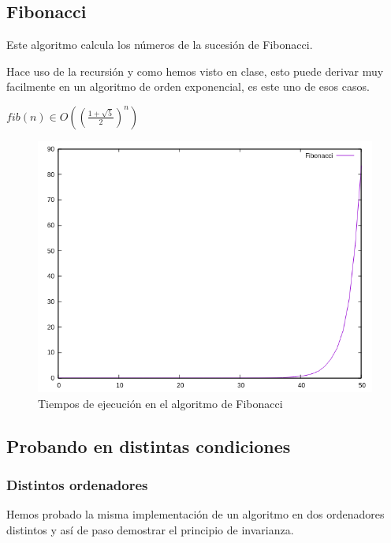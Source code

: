 \documentclass{article}
\begin{document}
\subsection{Fibonacci}
Este algoritmo calcula los números de la sucesión de Fibonacci. 
\

Hace uso de la recursión y como hemos visto en clase, esto puede derivar muy facilmente en un algoritmo de orden exponencial, es este uno de esos casos.
\

$fib(n) \in O((\frac{1+\sqrt5}{2})^n)$


\begin{figure}[H]
	\centering
	\includegraphics[totalheight=8cm]{img/fibonacci}
	\caption{Tiempos de ejecución en el algoritmo de Fibonacci}
	\label{fig:fibonacci}
\end{figure}

\subsection{Probando en distintas condiciones}
\subsubsection{Distintos ordenadores}
Hemos probado la misma implementación de un algoritmo en dos ordenadores distintos y así de paso demostrar el principio de invarianza.
\
\end{document}
